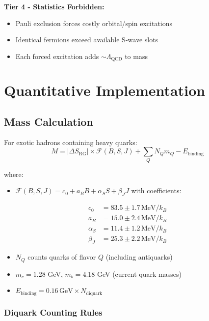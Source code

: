 \documentclass[12pt,a4paper]{article}
\begin{document}
\textbf{Tier 4 - Statistics Forbidden:} 
\begin{itemize}
\item Pauli exclusion forces costly orbital/spin excitations
\item Identical fermions exceed available S-wave slots
\item Each forced excitation adds $\sim\Lambda_{\text{QCD}}$ to mass
\end{itemize}

\section{Quantitative Implementation}

\subsection{Mass Calculation}

For exotic hadrons containing heavy quarks:
\begin{equation}
M = |\Delta S_{\text{RG}}| \times \mathcal{F}(B,S,J) + \sum_Q N_Q m_Q - E_{\text{binding}}
\end{equation}

where:
\begin{itemize}
\item $\mathcal{F}(B,S,J) = c_0 + a_B B + \alpha_S S + \beta_J J$ with coefficients:
\end{itemize}

\begin{align}
c_0 &= 83.5 \pm 1.7\,\text{MeV}/k_B \\
a_B &= 15.0 \pm 2.4\,\text{MeV}/k_B \\
\alpha_S &= 11.4 \pm 1.2\,\text{MeV}/k_B \\
\beta_J &= 25.3 \pm 2.2\,\text{MeV}/k_B
\end{align}

\begin{itemize}
\item $N_Q$ counts quarks of flavor $Q$ (including antiquarks)
\item $m_c = 1.28$ GeV, $m_b = 4.18$ GeV (current quark masses)
\item $E_{\text{binding}} = 0.16\,\text{GeV} \times N_{\text{diquark}}$
\end{itemize}

\subsubsection{Diquark Counting Rules}
\end{document}
